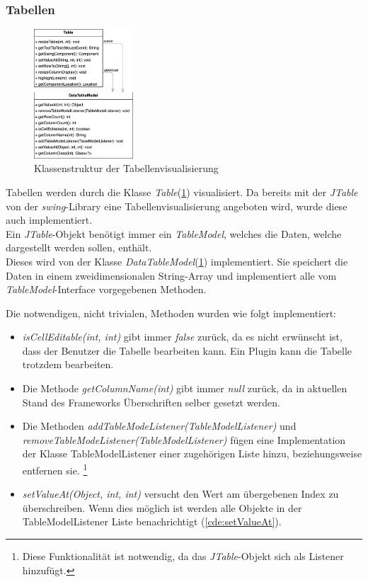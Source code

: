 \subsubsection{Tabellen}
\begin{figure}
  \centering
  \vspace{-20pt}
  \includegraphics[width=0.33\textwidth]{fig/GUI_Table_classes.png}
  \caption{Klassenstruktur der Tabellenvisualisierung}
  \label{fig:table-classes}
  \vspace{-20pt}
\end{figure}

Tabellen werden durch die Klasse \textit{Table}(\cref{fig:table-classes}) visualisiert. Da bereits
mit der \textit{JTable} von der \textit{swing}-Library eine
Tabellenvisualisierung angeboten wird, wurde diese auch implementiert.\\
Ein \textit{JTable}-Objekt benötigt immer ein \textit{TableModel}, welches
die Daten, welche dargestellt werden sollen, enthält.\\
Dieses wird von der Klasse \textit{DataTableModel}(\cref{fig:table-classes}) implementiert.
Sie speichert die Daten in einem zweidimensionalen String-Array und implementiert
alle vom \textit{TableModel}-Interface vorgegebenen Methoden.

Die notwendigen, nicht trivialen, Methoden wurden wie folgt implementiert:
\begin{itemize}
  \item \textit{isCellEditable(int, int)} gibt immer \textit{false} zurück,
    da es nicht erwünscht ist, dass der Benutzer die Tabelle bearbeiten kann.
    Ein Plugin kann die Tabelle trotzdem bearbeiten.
  \item Die Methode \textit{getColumnName(int)} gibt immer \textit{null} zurück,
    da in aktuellen Stand des Frameworks Überschriften selber gesetzt werden.
  \item Die Methoden \textit{addTableModeListener(TableModelListener)} und
    \textit{removeTableModeListener(TableModelListener)} fügen eine Implementation
    der Klasse TableModelListener einer zugehörigen Liste hinzu, beziehungsweise
    entfernen sie.
    \footnote{Diese Funktionalität ist notwendig, da das \textit{JTable}-Objekt sich als Listener hinzufügt.} 
  \item \textit{setValueAt(Object, int, int)} versucht den Wert am übergebenen Index
    zu überschreiben. Wenn dies möglich ist werden alle
    Objekte in der TableModelListener Liste benachrichtigt (\cref{cde:setValueAt}).
\end{itemize}


